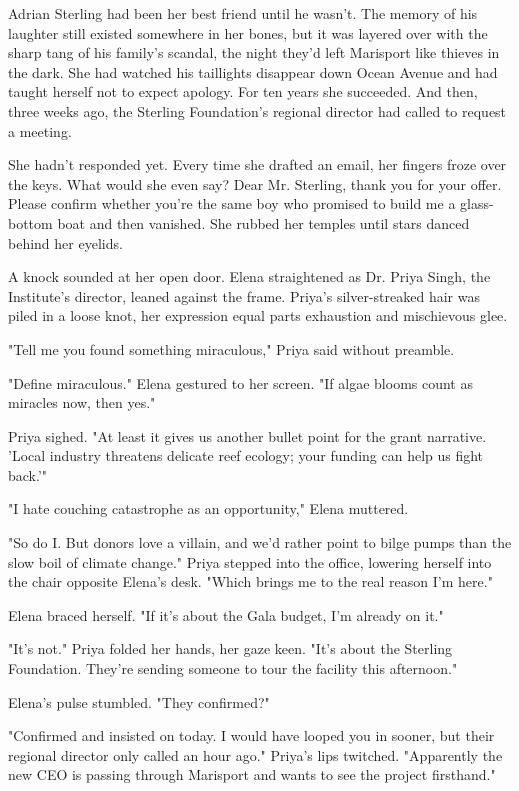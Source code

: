 Adrian Sterling had been her best friend until he wasn't. The memory of his laughter still existed somewhere in her bones, but it was layered over with the sharp tang of his family's scandal, the night they'd left Marisport like thieves in the dark. She had watched his taillights disappear down Ocean Avenue and had taught herself not to expect apology. For ten years she succeeded. And then, three weeks ago, the Sterling Foundation's regional director had called to request a meeting.

She hadn't responded yet. Every time she drafted an email, her fingers froze over the keys. What would she even say? Dear Mr. Sterling, thank you for your offer. Please confirm whether you're the same boy who promised to build me a glass-bottom boat and then vanished. She rubbed her temples until stars danced behind her eyelids.

A knock sounded at her open door. Elena straightened as Dr. Priya Singh, the Institute's director, leaned against the frame. Priya's silver-streaked hair was piled in a loose knot, her expression equal parts exhaustion and mischievous glee.

"Tell me you found something miraculous," Priya said without preamble.

"Define miraculous." Elena gestured to her screen. "If algae blooms count as miracles now, then yes."

Priya sighed. "At least it gives us another bullet point for the grant narrative. 'Local industry threatens delicate reef ecology; your funding can help us fight back.'"

"I hate couching catastrophe as an opportunity," Elena muttered.

"So do I. But donors love a villain, and we'd rather point to bilge pumps than the slow boil of climate change." Priya stepped into the office, lowering herself into the chair opposite Elena's desk. "Which brings me to the real reason I'm here."

Elena braced herself. "If it's about the Gala budget, I'm already on it."

"It's not." Priya folded her hands, her gaze keen. "It's about the Sterling Foundation. They're sending someone to tour the facility this afternoon."

Elena's pulse stumbled. "They confirmed?"

"Confirmed and insisted on today. I would have looped you in sooner, but their regional director only called an hour ago." Priya's lips twitched. "Apparently the new CEO is passing through Marisport and wants to see the project firsthand."

